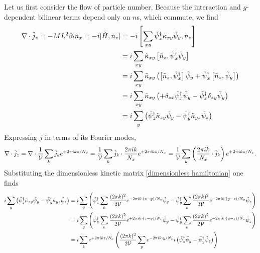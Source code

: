 Let us first consider the flow of particle number.
Because the interaction and $g$-dependent bilinear terms depend only on $n$s, which commute, we find
\begin{align}
	\nabla\cdot\tilde{j}_z = -ML^2 \partial_t \tilde{n}_x = -i[\tilde{H}, \tilde{n}_z]
	&=
		-i \left[
			\sum_{xy} \tilde{\psi}{}^{\dagger}_x \tilde{\kappa}_{xy} \tilde{\psi}_y,
		\tilde{n}_z\right]
	\nonumber\\
	&=
		i \sum_{xy} \tilde{\kappa}_{xy} \left[ \tilde{n}_z, \tilde{\psi}{}^{\dagger}_x \tilde{\psi}_y\right]
	\nonumber\\
	&=
		i \sum_{xy} \tilde{\kappa}_{xy} \left(
			\left[ \tilde{n}_z, \tilde{\psi}{}^{\dagger}_x \right]\tilde{\psi}_y
			+
			\tilde{\psi}{}^{\dagger}_x \left[ \tilde{n}_z, \tilde{\psi}_y\right]
		\right)
	\nonumber\\
	&=
		i \sum_{xy} \tilde{\kappa}_{xy} \left(
			+ \delta_{zx} \tilde{\psi}{}^{\dagger}_x \tilde{\psi}_y
			-
			\tilde{\psi}{}^{\dagger}_x \delta_{zy} \tilde{\psi}_y
		\right)
	\nonumber\\
	&=
		i \sum_{y} \left(
			\tilde{\psi}{}^{\dagger}_z \tilde{\kappa}_{zy} \tilde{\psi}_y
		-	\tilde{\psi}{}^{\dagger}_y \tilde{\kappa}_{yz} \tilde{\psi}_z
		\right)
\end{align}
Expressing $j$ in terms of its Fourier modes,
\begin{align}
	\nabla\cdot \tilde{j}_z
	=
	\nabla \cdot \frac{1}{\mathcal{V}}\sum_k \tilde{j}_k e^{+2\pi i k z/N_x}
	=
	\frac{1}{\mathcal{V}}\sum_k \tilde{j}_k \cdot \frac{2\pi i k}{N_x} e^{+2\pi i k z/N_x}
	=
	\frac{1}{\mathcal{V}}\sum_k \left( \frac{2\pi i k}{N_x} \cdot \tilde{j}_k \right) e^{+2\pi i k z/N_x}.
	\label{eq:divergence of j}
\end{align}
Substituting the dimensionless kinetic matrix \eqref{dimensionless hamiltonian} one finds
\begin{align}
	i \sum_{y} \left(
		\tilde{\psi}{}^{\dagger}_z \tilde{\kappa}_{zy} \tilde{\psi}_y
	-	\tilde{\psi}{}^{\dagger}_y \tilde{\kappa}_{yz} \tilde{\psi}_z
	\right)
	&=
	i \sum_{y} \left(
		\tilde{\psi}{}^{\dagger}_z \sum_{k} \frac{(2\pi k)^2}{2 \mathcal{V}} e^{-2\pi i k \cdot(z-y)/N_x} \tilde{\psi}_y
	-	\tilde{\psi}{}^{\dagger}_y \sum_{k} \frac{(2\pi k)^2}{2 \mathcal{V}} e^{-2\pi i k \cdot(y-z)/N_x} \tilde{\psi}_z
	\right)
	\nonumber\\
	&=
	i \sum_{y} \left(
		\tilde{\psi}{}^{\dagger}_z \sum_{k} \frac{(2\pi k)^2}{2 \mathcal{V}} e^{+2\pi i k \cdot(z-y)/N_x} \tilde{\psi}_y
	-	\tilde{\psi}{}^{\dagger}_y \sum_{k} \frac{(2\pi k)^2}{2 \mathcal{V}} e^{-2\pi i k \cdot(y-z)/N_x} \tilde{\psi}_z
	\right)
	\nonumber\\
	&=
	i\sum_k e^{+2\pi i k z / N_x}\left(
		\frac{(2\pi k)^2}{2\mathcal{V}} \sum_y e^{-2\pi i k \cdot y / N_x} i \left(\tilde{\psi}{}^{\dagger}_z \tilde{\psi}_y  - \tilde{\psi}{}^{\dagger}_y \tilde{\psi}_z \right)
	\right)
	\label{eq:current operator intermediate}
\end{align}
